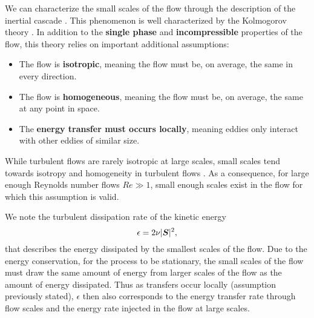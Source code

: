 We can characterize the small scales of the flow through the description of the inertial cascade \citep{richardson1922weather}.
This phenomenon is well characterized by the Kolmogorov theory \citep{kolmogorov1941dissipation, kolmogorov1941degeneration, kolmogorov1941logarithmically, kolmogorov1941local}.
In addition to the \textbf{single phase} and \textbf{incompressible} properties of the flow, this theory relies on important additional assumptions:
\begin{itemize}
	\item The flow is \textbf{isotropic}, meaning the flow must be, on average, the same in every direction. 
	\item The flow is \textbf{homogeneous}, meaning the flow must be, on average, the same at any point in space.
	\item The \textbf{energy transfer must occurs locally}, meaning eddies only interact with other eddies of similar size.
\end{itemize}
While turbulent flows are rarely isotropic at large scales, small scales tend towards isotropy and homogeneity in turbulent flows \citep{frisch1995turbulence}.
As a consequence, for large enough Reynolds number flows $\mathit{Re} \gg 1$, small enough scales exist in the flow for which this assumption is valid.

We note the turbulent dissipation rate of the kinetic energy
\begin{equation}\label{eq:dissipation_rate}
	\epsilon = 2 \nu \lvert\boldsymbol{S}\rvert^2,
\end{equation}
that describes the energy dissipated by the smallest scales of the flow.
Due to the energy conservation, for the process to be stationary, the small scales of the flow must draw the same amount of energy from larger scales of the flow as the amount of energy dissipated.
Thus as transfers occur locally (assumption previously stated), $\epsilon$ then also corresponds to the energy transfer rate through flow scales and the energy rate injected in the flow at large scales.

